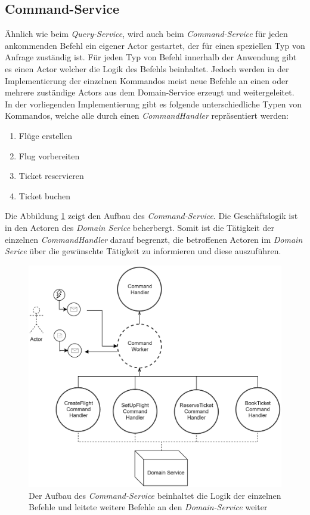 \subsection{Command-Service}
\label{subsec:implementation:commandService}
 Ähnlich wie beim \textit{Query-Service}, wird auch beim \textit{Command-Service} für jeden ankommenden Befehl ein eigener Actor gestartet, der für einen speziellen Typ von Anfrage zuständig ist. Für jeden Typ von Befehl innerhalb der Anwendung gibt es einen Actor welcher die Logik des Befehls beinhaltet. Jedoch werden in der Implementierung der einzelnen Kommandos meist neue Befehle an einen oder mehrere zuständige Actors aus dem Domain-Service erzeugt und weitergeleitet. \\
 In der vorliegenden Implementierung gibt es folgende unterschiedliche Typen von Kommandos, welche alle durch einen \textit{CommandHandler} repräsentiert werden:
 \begin{enumerate}
   \item Flüge erstellen
   \item Flug vorbereiten
   \item Ticket reservieren
   \item Ticket buchen
 \end{enumerate}
Die Abbildung \ref{fig:implementation:commandActorModel} zeigt den Aufbau des \textit{Command-Service}. Die Geschäftslogik ist in den Actoren des \textit{Domain Serice} beherbergt. Somit ist die Tätigkeit der einzelnen \textit{CommandHandler} darauf begrenzt, die betroffenen Actoren im \textit{Domain Serice} über die gewünschte Tätigkeit zu informieren und diese auszuführen. 
 \begin{figure}
  \centering
  \includegraphics[width=0.8\linewidth]{gfx/implementation/CommandServiceActorModel}
  \caption{Der Aufbau des \textit{Command-Service} beinhaltet die Logik der einzelnen Befehle und leitete weitere Befehle an den \textit{Domain-Service} weiter }
  \label{fig:implementation:commandActorModel}
\end{figure} 

